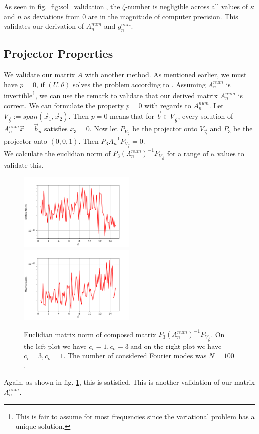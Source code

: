 \documentclass[12pt,journal,compsoc, onecolumn]{IEEEtran}
\begin{document}
\noindent
As seen in fig. \ref{fig:sol_validation}, the $\zeta$-number is negligible across all values of $\kappa$ and $n$ as deviations from $0$ are in the magnitude of computer precision. This validates our derivation of $A_n^{num}$ and $g_n^{num}$.
\subsection{Projector Properties}
\label{subsection:projector_properties}
We validate our matrix $A$ with another method. As mentioned earlier, we must have \(p=0\), if \((U, \theta)\) solves the problem according to \cite{meury2007stable}. 
Assuming $A^{num}_n$ is invertible\footnote{This is fair to assume for most frequencies since the variational problem has a unique solution.}, we can use the remark to validate that our derived matrix $A^{num}_n$ is correct.  We can formulate the property $p = 0$ with regards to $A^{num}_n$. 
Let $V_{\vec{b}} := span( \vec{x}_1, \vec{x}_2)$. 
Then $p = 0$ means that for $\vec{b} \in V_{\vec{b}}$, every solution of  $A_n^{num} \vec{x} = \vec{b}_n$ satisfies $x_3 = 0$. Now let
$P_{V_{\vec{b}}}$ be the projector onto $V_{\vec{b}}$ and $P_3$ be the projector onto $(0, 0, 1)$.
Then $P_3A_n^{-1}P_{V_{\vec{b}}} = 0$. \\
We calculate the euclidian norm of $P_3 (A^{num}_n)^{-1}P_{V_{\vec{b}}}$ for a range of $\kappa$ values to validate this.
\begin{figure}
    \includegraphics[width=0.5\textwidth]{validate_p_c_i1,0c_o3,0N_100plotRangeStart_0,5plotRangeEnd_15,0.pdf}
    \includegraphics[width=0.5\textwidth]{validate_p_c_i3,0c_o1,0N_100plotRangeStart_0,5plotRangeEnd_15,0.pdf}
    \caption{Euclidian matrix norm of composed matrix  $P_3 (A^{num}_n)^{-1}P_{V_{\vec{b}}}$. 
    On the left plot we have $c_i = 1, c_o = 3$
    and on the right plot we have $c_i = 3, c_o = 1$. The number of considered Fourier modes was $N = 100$.
    }
   \label{fig:p_validation}
\end{figure}
\noindent
Again, as shown in fig. \ref{fig:p_validation}, this is satisfied. This is another validation of our matrix $A_n^{num}$. 
\end{document}
